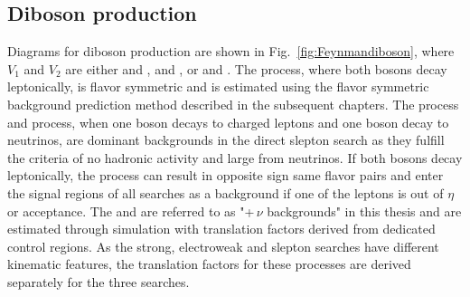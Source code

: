 \subsection*{Diboson production}
\noindent
\justify
Diagrams for diboson production are shown in Fig.~\ref{fig:Feynmandiboson}, where $V_1$ and $V_2$ are either \PW and \PW, \PZ and \PZ, or \PW and \PZ. 
The \PWW process, where both \PW bosons decay leptonically, is flavor symmetric and is estimated using the flavor symmetric background prediction method described in the subsequent chapters. 
The \PZZ process and \PWZ process, when one \PZ boson decays to charged leptons and one \PZ boson decay to neutrinos, are dominant backgrounds in the direct slepton search as they fulfill the criteria of no hadronic activity and large \ptmiss from neutrinos. 
If both bosons decay leptonically, the \PWZ process can result in opposite sign same flavor pairs and enter the signal regions of all searches as a background if one of the leptons is out of $\eta$ or \pt acceptance. 
\newpara
\noindent\justify
The \PZZ and \PWZ are referred to as "\PZ+$\,\nu$ backgrounds" in this thesis and are estimated through simulation with translation factors derived from dedicated control regions. 
As the strong, electroweak and slepton searches have different kinematic features, the translation factors for these processes are derived separately for the three searches.
